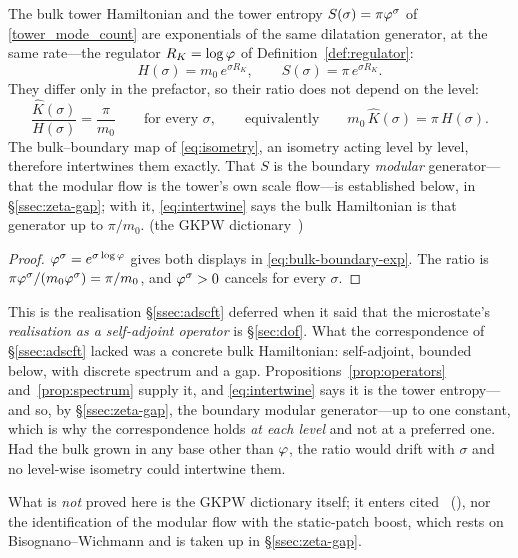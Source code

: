 \begin{theorem}\label{thm:intertwine}
The bulk tower Hamiltonian and the tower entropy $S(\sigma)=\pi\varphi^{\sigma}$ of
\eqref{tower_mode_count} are exponentials of the same dilatation generator, at the same rate---the
regulator $R_K=\log\varphi$ of Definition~\ref{def:regulator}:
\begin{equation}\label{eq:bulk-boundary-exp}
  H(\sigma)=m_0\,e^{\sigma R_K},
  \qquad
  S(\sigma)=\pi\,e^{\sigma R_K}.
\end{equation}
They differ only in the prefactor, so their ratio does not depend on the level:
\begin{equation}\label{eq:intertwine}
  \frac{\hat K(\sigma)}{H(\sigma)}=\frac{\pi}{m_0}
  \qquad\text{for every }\sigma,
  \qquad\text{equivalently}\qquad
  m_0\,\hat K(\sigma)=\pi\,H(\sigma).
\end{equation}
The bulk--boundary map of \eqref{eq:isometry}, an isometry acting level by level, therefore
intertwines them exactly. That $S$ is the boundary \emph{modular} generator---that the modular flow
is the tower's own scale flow---is established below, in \S\ref{ssec:zeta-gap}; with it,
\eqref{eq:intertwine} says the bulk Hamiltonian is that generator up to $\pi/m_0$.
(the GKPW dictionary~\cite{GKP98,Witten98})%

%
\end{theorem}
\begin{proof}
$\varphi^{\sigma}=e^{\sigma\log\varphi}$ gives both displays in \eqref{eq:bulk-boundary-exp}. The
ratio is $\pi\varphi^{\sigma}/(m_0\varphi^{\sigma})=\pi/m_0$, and $\varphi^{\sigma}>0$ cancels for
every $\sigma$.
\end{proof}

\begin{remark}\label{rmk:intertwine-scope}
This is the realisation \S\ref{ssec:adscft} deferred when it said that the microstate's
\emph{realisation as a self-adjoint operator} is \S\ref{sec:dof}. What the correspondence of
\S\ref{ssec:adscft} lacked was a concrete bulk Hamiltonian: self-adjoint, bounded below, with
discrete spectrum and a gap. Propositions~\ref{prop:operators} and~\ref{prop:spectrum} supply it,
and \eqref{eq:intertwine} says it is the tower entropy---and so, by \S\ref{ssec:zeta-gap}, the
boundary modular generator---up to one constant, which is why the correspondence holds \emph{at
each level} and not at a preferred one. Had the bulk
grown in any base other than $\varphi$, the ratio would drift with $\sigma$ and no level-wise
isometry could intertwine them.

What is \emph{not} proved here is the GKPW dictionary itself; it enters cited~\cite{GKP98,Witten98}
(\cite{Maldacena98,GKP98,Witten98}), nor the identification of the modular flow with the
static-patch boost, which rests on Bisognano--Wichmann and is taken up in \S\ref{ssec:zeta-gap}.
\end{remark}

